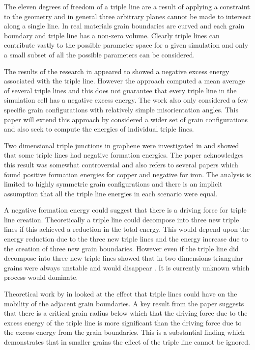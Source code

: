 \documentclass[12pt,a4paper,openany]{report}
\begin{document}
The eleven degrees of freedom of a triple line are a result of applying a constraint to the geometry and in general three arbitrary planes cannot be made to intersect along a single line.  In real materials grain boundaries are curved and each grain boundary and triple line has a non-zero volume. Clearly triple lines can contribute vastly to the possible parameter space for a given simulation and only a small subset of all the possible parameters can be considered.

The results of the research in \cite{Srinivasan1999} appeared to showed a negative excess energy associated with the triple line. However the approach computed a mean average of several triple lines and this does not guarantee that every triple line in the simulation cell has a negative excess energy. The work also only considered a few specific grain configurations with relatively simple misorientation angles. This paper will extend this approach by considered a wider set of grain configurations and also seek to compute the energies of individual triple lines.

Two dimensional triple junctions in graphene were  investigated in \citep{Hirvonen2017} and showed that some triple lines had negative formation energies. The paper acknowledges this result was somewhat controversial and also refers to several papers which found positive formation energies for copper and negative for iron. The analysis is limited to highly symmetric grain configurations and there is an implicit assumption that all the triple line energies in each scenario were equal.

A negative formation energy could suggest that there is a driving force for triple line creation. Theoretically a triple line could decompose into three new triple lines if this achieved a reduction in the total energy. This would depend upon the energy reduction due to the three new triple lines and the energy increase due to the creation of three new grain boundaries. However even if the triple line did decompose into three new triple lines \citeauthor{Shvindlerman2005} showed that in two dimensions triangular grains were always unstable and would disappear \cite{Shvindlerman2005}. It is currently unknown which process would dominate. 

Theoretical work by \citeauthor{GOTTSTEIN2010914} in \cite{GOTTSTEIN2010914} looked at the effect that triple lines could have on the mobility of the adjacent grain boundaries. A key result from the paper suggests that there is a critical grain radius below which that the driving force due to the excess energy of the triple line is more significant than the driving force due to the excess energy from the grain boundaries. This is a substantial finding which demonstrates that in smaller grains the effect of the triple line cannot be ignored. 
 
\end{document}
